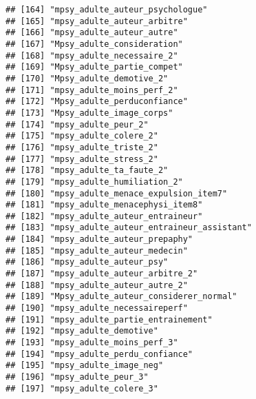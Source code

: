 \documentclass[
]{article}
\begin{document}
\begin{verbatim}
## [164] "mpsy_adulte_auteur_psychologue"                                    
## [165] "mpsy_adulte_auteur_arbitre"                                        
## [166] "mpsy_adulte_auteur_autre"                                          
## [167] "Mpsy_adulte_consideration"                                         
## [168] "mpsy_adulte_necessaire_2"                                          
## [169] "Mpsy_adulte_partie_compet"                                         
## [170] "Mpsy_adulte_demotive_2"                                            
## [171] "mpsy_adulte_moins_perf_2"                                          
## [172] "Mpsy_adulte_perduconfiance"                                        
## [173] "Mpsy_adulte_image_corps"                                           
## [174] "mpsy_adulte_peur_2"                                                
## [175] "mpsy_adulte_colere_2"                                              
## [176] "mpsy_adulte_triste_2"                                              
## [177] "mpsy_adulte_stress_2"                                              
## [178] "mpsy_adulte_ta_faute_2"                                            
## [179] "mpsy_adulte_humiliation_2"                                         
## [180] "mpsy_adulte_menace_expulsion_item7"                                
## [181] "mpsy_adulte_menacephysi_item8"                                     
## [182] "mpsy_adulte_auteur_entraineur"                                     
## [183] "mpsy_adulte_auteur_entraineur_assistant"                           
## [184] "mpsy_adulte_auteur_prepaphy"                                       
## [185] "mpsy_adulte_auteur_medecin"                                        
## [186] "mpsy_adulte_auteur_psy"                                            
## [187] "mpsy_adulte_auteur_arbitre_2"                                      
## [188] "mpsy_adulte_auteur_autre_2"                                        
## [189] "Mpsy_adulte_auteur_considerer_normal"                              
## [190] "mpsy_adulte_necessaireperf"                                        
## [191] "mpsy_adulte_partie_entrainement"                                   
## [192] "mpsy_adulte_demotive"                                              
## [193] "mpsy_adulte_moins_perf_3"                                          
## [194] "mpsy_adulte_perdu_confiance"                                       
## [195] "mpsy_adulte_image_neg"                                             
## [196] "mpsy_adulte_peur_3"                                                
## [197] "mpsy_adulte_colere_3"                                              

\end{verbatim}
\end{document}
